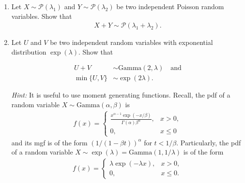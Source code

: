 
\begin{exercise}

\phantom{}

\begin{enumerate}[label = (\alph*)]
  \item Let $X \sim \mathcal{P}(\lambda_1)$ and $Y \sim \mathcal{P}(\lambda_2)$ be
  two independent Poisson random variables. Show that
  \begin{align*}
    X + Y \sim \mathcal{P}(\lambda_1 + \lambda_2).
  \end{align*}
  \item Let $U$ and $V$ be two independent random variables with exponential
  distribution $\exp(\lambda)$. Show that

  \begin{align*}
    U + V &\sim \text{Gamma}(2,\lambda) \quad \text{and} \\
    \min\{U,V\} &\sim \exp(2\lambda).
  \end{align*}

  \textit{Hint:} It is useful to use moment generating functions. Recall, the pdf
  of a random variable $X \sim \text{Gamma}(\alpha,\beta)$ is
  \begin{align*}
    f(x) = \begin{cases}
      \frac{x^{\alpha-1}\exp(-x/\beta)}{\Gamma(\alpha)\beta^\alpha}, & x > 0, \\
      0, & x \leq 0
    \end{cases}
  \end{align*}
  and its mgf is of the form $(1/(1- \beta t))^\alpha$ for $t < 1/\beta$.
  Particularly, the pdf of a random variable $X \sim \exp(\lambda) = \text{Gamma}(1,1/\lambda)$
  is of the form
  \begin{align*}
    f(x) = \begin{cases}
      \lambda \exp(-\lambda x), & x > 0, \\
      0, & x \leq 0.
    \end{cases}
  \end{align*}
\end{enumerate}

\end{exercise}



